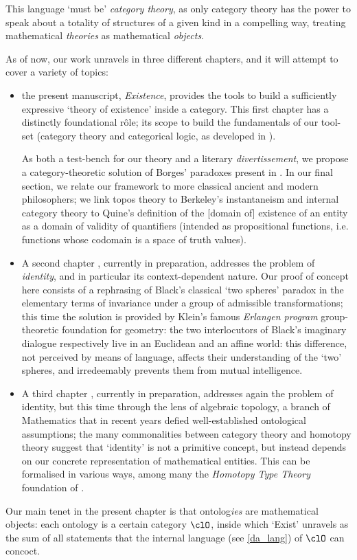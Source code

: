  This language `must be' \emph{category theory}, as only category theory has the power to speak about a totality of structures of a given kind in a compelling way, treating mathematical \emph{theories} as mathematical \emph{objects}.

As of now, our work unravels in three different chapters, and it will attempt to cover a variety of topics:
\begin{itemize}
	\item the present manuscript, \emph{Existence}, provides the tools to build a sufficiently expressive `theory of existence' inside a category. This first chapter has a distinctly foundational r\^ole; its scope to build the fundamentals of our tool-set (category theory and categorical logic, as developed in \cite{mac1992sheaves,JohnstonePT,lambek1988introduction}).

	      As both a test-bench for our theory and a literary \emph{divertissement}, we propose a category-theoretic solution of Borges' paradoxes present in \cite{Borges1963}. In our final section, we relate our framework to more classical ancient and modern philosophers; we link topos theory to Berkeley's instantaneism and internal category theory to Quine's definition of the [domain of] existence of an entity as a domain of validity of quantifiers (intended as propositional functions, i.e. functions whose codomain is a space of truth values).
	\item A second chapter \cite{black}, currently in preparation, addresses the problem of \emph{identity}, and in particular its context-dependent nature. Our proof of concept here consists of a rephrasing of Black's classical `two spheres' paradox \cite{papear_di_black} in the elementary terms of invariance under a group of admissible transformations; this time the solution is provided by Klein's famous \emph{Erlangen program} group-theoretic foundation for geometry: the two interlocutors of Black's imaginary dialogue respectively live in an Euclidean and an affine world: this difference, not perceived by means of language, affects their understanding of the `two' spheres, and irredeemably prevents them from mutual intelligence.
	\item A third chapter \cite{homot}, currently in preparation, addresses again the problem of identity, but this time through the lens of algebraic topology, a branch of Mathematics that in recent years defied well\hyp{}established ontological assumptions; the many commonalities between category theory and homotopy theory suggest that `identity' is not a primitive concept, but instead depends on our concrete representation of mathematical entities. This can be formalised in various ways, among many the \emph{Homotopy Type Theory} foundation of \cite{hottbook,cwp}. 
\end{itemize}
Our main tenet in the present chapter is that ontolog\emph{ies} are mathematical objects: each ontology is a certain category $\clO$, inside which `Exist' unravels as the sum of all statements that the internal language (see \ref{da_lang}) of $\clO$ can concoct.

